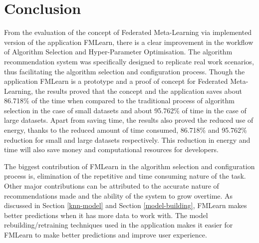 \chapter{Conclusion}

From the evaluation of the concept of Federated Meta-Learning via implemented version of the application FMLearn, there is a clear improvement in the workflow of Algorithm Selection and Hyper-Parameter Optimisation. The algorithm recommendation system was specifically designed to replicate real work scenarios, thus facilitating the algorithm selection and configuration process. Though the application FMLearn is a prototype and a proof of concept for Federated Meta-Learning, the results proved that the concept and the application saves about 86.718\% of the time when compared to the traditional process of algorithm selection in the case of small datasets and about 95.762\% of time in the case of large datasets. Apart from saving time, the results also proved the reduced use of energy, thanks to the reduced amount of time consumed, 86.718\% and 95.762\% reduction for small and large datasets respectively. This reduction in energy and time will also save money and computational resources for developers.

The biggest contribution of FMLearn in the algorithm selection and configuration process is, elimination of the repetitive and time consuming nature of the task. Other major contributions can be attributed to the accurate nature of recommendations made and the ability of the system to grow overtime. As discussed in Section \ref{knn-model} and Section \ref{model-building}, FMLearn makes better predictions when it has more data to work with. The model rebuilding/retraining techniques used in the application makes it easier for FMLearn to make better predictions and improve user experience. 